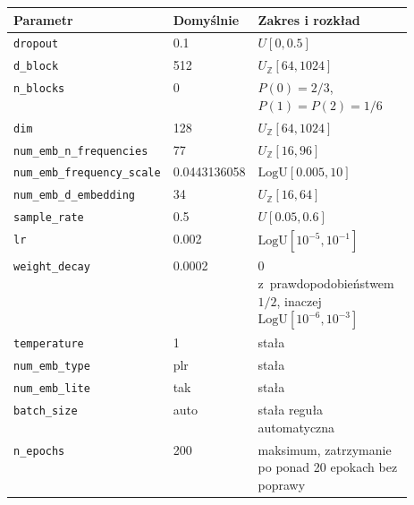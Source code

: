 \par\medskip\noindent\begin{minipage}{\linewidth}\captionsetup{hypcap=false}\centering\footnotesize
{}
\begin{tabularx}{\linewidth}{@{}P{0.32\linewidth}P{0.20\linewidth}Y@{}}
\toprule Parametr & Domyślnie & Zakres i rozkład \\
\midrule
\texttt{dropout} & 0.1 & $U[0,0.5]$ \\
\texttt{d\_block} & 512 & $U_{\mathbb Z}[64,1024]$ \\
\texttt{n\_blocks} & 0 & $P(0)=2/3$, $P(1)=P(2)=1/6$ \\
\texttt{dim} & 128 & $U_{\mathbb Z}[64,1024]$ \\
\texttt{num\_emb\_n\_frequencies} & 77 & $U_{\mathbb Z}[16,96]$ \\
\texttt{num\_emb\_frequency\_scale} & 0.0443136058 & $\mathrm{LogU}[0.005,10]$ \\
\texttt{num\_emb\_d\_embedding} & 34 & $U_{\mathbb Z}[16,64]$ \\
\texttt{sample\_rate} & 0.5 & $U[0.05,0.6]$ \\
\texttt{lr} & 0.002 & $\mathrm{LogU}[10^{-5},10^{-1}]$ \\
\texttt{weight\_decay} & 0.0002 & 0 z~prawdopodobieństwem $1/2$, inaczej $\mathrm{LogU}[10^{-6},10^{-3}]$ \\
\texttt{temperature} & 1 & stała \\
\texttt{num\_emb\_type} & plr & stała \\
\texttt{num\_emb\_lite} & tak & stała \\
\texttt{batch\_size} & auto & stała reguła automatyczna \\
\texttt{n\_epochs} & 200 & maksimum, zatrzymanie po ponad 20 epokach bez poprawy \\
\bottomrule\end{tabularx}\end{minipage}\par\medskip

